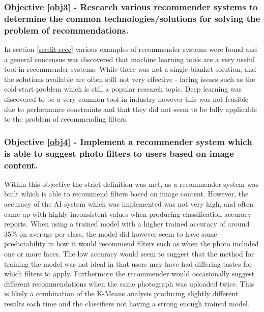 \documentclass[a4paper,12pt]{report}
\begin{document}
  \subsubsection{Objective \ref{obj3} - Research various recommender systems to determine the common technologies/solutions for solving the problem of recommendations.}
    In section \ref{sec:lit-recc} various examples of recommender systems were found and a general concensus was discovered that machine learning tools are a very useful tool in recommender systems. While there was not a single blanket solution, and the solutions available are often still not very effective - facing issues such as the cold-start problem which is still a popular research topic. Deep learning was discovered to be a very common tool in industry however this was not feasible due to performance constraints and that they did not seem to be fully applicable to the problem of recommending filters.

  \subsubsection{Objective \ref{obj4} - Implement a recommender system which is able to suggest photo filters to users based on image content.}
    Within this objective the strict definition was met, as a recommender system was built which is able to recommend filters based on image content. However, the accuracy of the AI system which was implemented was not very high, and often came up with highly inconsistent values when producing classification accuracy reports. When using a trained model with a higher trained accuracy of around 35\% on average per class, the model did however seem to have some predictability in how it would recommend filters such as when the photo included one or more faces. The low accuracy would seem to suggest that the method for training the model was not ideal in that users may have had differing tastes for which filters to apply. Furthermore the recommender would occasionally suggest different recommendations when the same photograph was uploaded twice. This is likely a combination of the K-Means analysis producing slightly different results each time and the classifiers not having a strong enough trained model.
\end{document}
